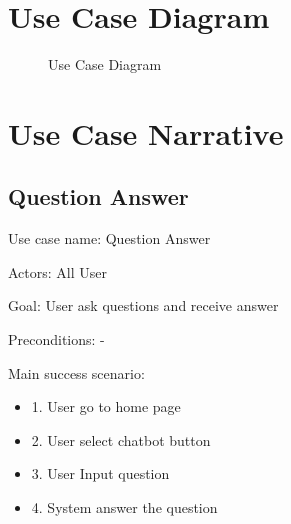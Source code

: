 \documentclass[12pt,oneside,openright,a4paper]{cpe-english-project}
\begin{document}
  \newpage
  \section{Use Case Diagram}
  \begin{figure}[!h]
    \centering
    \caption{Use Case Diagram}\label{fig:Use_Case}
  \end{figure}

  \section{Use Case Narrative}
    \subsection{Question Answer}
      \qquad Use case name: Question Answer \par
      \qquad Actors: All User \par
      \qquad Goal: User ask questions and receive answer \par
      \qquad Preconditions: - \par
      \qquad Main success scenario:
      \begin{itemize}
        \item[] 1. User go to home page
        \item[] 2. User select chatbot button
        \item[] 3. User Input question
        \item[] 4. System answer the question
      \end{itemize}
\end{document}
